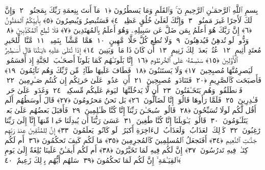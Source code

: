 
  
    
  
    
    

\nopagebreak
  بِسمِ ٱللَّهِ ٱلرَّحمَـٰنِ ٱلرَّحِيمِ
  نٓ ۚ وَٱلقَلَمِ وَمَا يَسطُرُونَ ﴿١﴾
 مَآ أَنتَ بِنِعمَةِ رَبِّكَ بِمَجنُونٍۢ ﴿٢﴾
 وَإِنَّ لَكَ لَأَجرًا غَيرَ مَمنُونٍۢ ﴿٣﴾
 وَإِنَّكَ لَعَلَىٰ خُلُقٍ عَظِيمٍۢ ﴿٤﴾
 فَسَتُبصِرُ وَيُبصِرُونَ ﴿٥﴾
 بِأَييِّكُمُ ٱلمَفتُونُ ﴿٦﴾
 إِنَّ رَبَّكَ هُوَ أَعلَمُ بِمَن ضَلَّ عَن سَبِيلِهِۦ وَهُوَ أَعلَمُ بِٱلمُهتَدِينَ ﴿٧﴾
 فَلَا تُطِعِ ٱلمُكَذِّبِينَ ﴿٨﴾
 وَدُّوا۟ لَو تُدهِنُ فَيُدهِنُونَ ﴿٩﴾
 وَلَا تُطِع كُلَّ حَلَّافٍۢ مَّهِينٍ ﴿١٠﴾
 هَمَّازٍۢ مَّشَّآءٍۭ بِنَمِيمٍۢ ﴿١١﴾
 مَّنَّاعٍۢ لِّلخَيرِ مُعتَدٍ أَثِيمٍ ﴿١٢﴾
 عُتُلٍّۭ بَعدَ ذَٟلِكَ زَنِيمٍ ﴿١٣﴾
 أَن كَانَ ذَا مَالٍۢ وَبَنِينَ ﴿١٤﴾
 إِذَا تُتلَىٰ عَلَيهِ ءَايَـٰتُنَا قَالَ أَسَـٰطِيرُ ٱلأَوَّلِينَ ﴿١٥﴾
 سَنَسِمُهُۥ عَلَى ٱلخُرطُومِ ﴿١٦﴾
 إِنَّا بَلَونَـٰهُم كَمَا بَلَونَآ أَصحَـٰبَ ٱلجَنَّةِ إِذ أَقسَمُوا۟ لَيَصرِمُنَّهَا مُصبِحِينَ ﴿١٧﴾
 وَلَا يَستَثنُونَ ﴿١٨﴾
 فَطَافَ عَلَيهَا طَآئِفٌۭ مِّن رَّبِّكَ وَهُم نَآئِمُونَ ﴿١٩﴾
 فَأَصبَحَت كَٱلصَّرِيمِ ﴿٢٠﴾
 فَتَنَادَوا۟ مُصبِحِينَ ﴿٢١﴾
 أَنِ ٱغدُوا۟ عَلَىٰ حَرثِكُم إِن كُنتُم صَـٰرِمِينَ ﴿٢٢﴾
 فَٱنطَلَقُوا۟ وَهُم يَتَخَـٰفَتُونَ ﴿٢٣﴾
 أَن لَّا يَدخُلَنَّهَا ٱليَومَ عَلَيكُم مِّسكِينٌۭ ﴿٢٤﴾
 وَغَدَوا۟ عَلَىٰ حَردٍۢ قَـٰدِرِينَ ﴿٢٥﴾
 فَلَمَّا رَأَوهَا قَالُوٓا۟ إِنَّا لَضَآلُّونَ ﴿٢٦﴾
 بَل نَحنُ مَحرُومُونَ ﴿٢٧﴾
 قَالَ أَوسَطُهُم أَلَم أَقُل لَّكُم لَولَا تُسَبِّحُونَ ﴿٢٨﴾
 قَالُوا۟ سُبحَـٰنَ رَبِّنَآ إِنَّا كُنَّا ظَـٰلِمِينَ ﴿٢٩﴾
 فَأَقبَلَ بَعضُهُم عَلَىٰ بَعضٍۢ يَتَلَـٰوَمُونَ ﴿٣٠﴾
 قَالُوا۟ يَـٰوَيلَنَآ إِنَّا كُنَّا طَٰغِينَ ﴿٣١﴾
 عَسَىٰ رَبُّنَآ أَن يُبدِلَنَا خَيرًۭا مِّنهَآ إِنَّآ إِلَىٰ رَبِّنَا رَٰغِبُونَ ﴿٣٢﴾
 كَذَٟلِكَ ٱلعَذَابُ ۖ وَلَعَذَابُ ٱلءَاخِرَةِ أَكبَرُ ۚ لَو كَانُوا۟ يَعلَمُونَ ﴿٣٣﴾
 إِنَّ لِلمُتَّقِينَ عِندَ رَبِّهِم جَنَّـٰتِ ٱلنَّعِيمِ ﴿٣٤﴾
 أَفَنَجعَلُ ٱلمُسلِمِينَ كَٱلمُجرِمِينَ ﴿٣٥﴾
 مَا لَكُم كَيفَ تَحكُمُونَ ﴿٣٦﴾
 أَم لَكُم كِتَـٰبٌۭ فِيهِ تَدرُسُونَ ﴿٣٧﴾
 إِنَّ لَكُم فِيهِ لَمَا تَخَيَّرُونَ ﴿٣٨﴾
 أَم لَكُم أَيمَـٰنٌ عَلَينَا بَٰلِغَةٌ إِلَىٰ يَومِ ٱلقِيَـٰمَةِ ۙ إِنَّ لَكُم لَمَا تَحكُمُونَ ﴿٣٩﴾
 سَلهُم أَيُّهُم بِذَٟلِكَ زَعِيمٌ ﴿٤٠﴾
